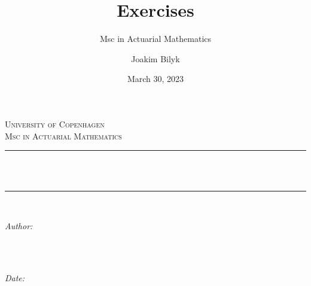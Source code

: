 \documentclass[
]{book}
\title{Exercises}
\subtitle{Msc in Actuarial Mathematics}
\author{Joakim Bilyk}
\date{March 30, 2023}
\begin{document}


{
\begin{titlepage}
\newcommand{\HRule}{\rule{\linewidth}{0.5mm}} %

\center %
 

\textsc{\LARGE University of Copenhagen}\\[4cm] %
\textsc{\Large Msc in Actuarial Mathematics}\\[0.5cm] %


\HRule \\[0.4cm]
{ \huge \bfseries \thetitle}\\[0.4cm] %
\HRule \\[1.5cm]
 

\begin{minipage}{0.4\textwidth}
\begin{flushleft} \large
\emph{Author:}\\
\textsc{\theauthor} \\
\end{flushleft}
\end{minipage}
~
\begin{minipage}{0.4\textwidth}
\begin{flushright} \large
\emph{Date:} \\
\textsc{\thedate} \\
\end{flushright}
\end{minipage}\\[2cm]


\end{titlepage}}
\end{document}
